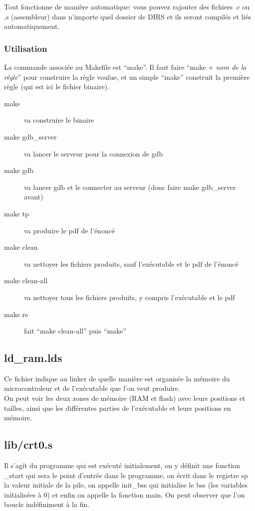 \documentclass[a4paper,10pt]{article} %
\begin{document}
Tout fonctionne de manière automatique: vous pouvez rajouter des fichiers .c ou .s (assembleur) dans n'importe quel dossier de DIRS et ils seront compilés et liés automatiquement.

\subsubsection{Utilisation}
La commande associée au Makefile est ``make''. Il faut faire ``make + \textit{nom de la règle}'' pour construire la règle voulue, et un simple ``make'' construit la première règle (qui est ici le fichier binaire).\\

\begin{description}
    \item[make] va construire le binaire
    \item[make gdb\_server] va lancer le serveur pour la connexion de gdb
    \item[make gdb] va lancer gdb et le connecter au serveur (donc faire make gdb\_server avant)
    \item[make tp] va produire le pdf de l'énoncé
    \item[make clean] va nettoyer les fichiers produits, sauf l’exécutable et le pdf de l'énoncé
    \item[make clean-all] va nettoyer tous les fichiers produits, y compris l’exécutable et le pdf
    \item[make re] fait ``make clean-all'' puis ``make''
\end{description}

\subsection{ld\_ram.lds}
Ce fichier indique au linker de quelle manière est organisée la mémoire du microcontroleur et de l’exécutable que l'on veut produire.\\

On peut voir les deux zones de mémoire (RAM et flash) avec leurs positions et tailles, ainsi que les différentes parties de l’exécutable et leurs positions en mémoire.

\subsection{lib/crt0.s}
Il s'agit du programme qui est exécuté initialement, on y définit une fonction \_start qui sera le point d'entrée dans le programme, on écrit dans le registre sp la valeur initiale de la pile, on appelle init\_bss qui initialise le bss (les variables initialisées à 0) et enfin on appelle la fonction main. On peut observer que l'on boucle indéfiniment à la fin.
\end{document}
